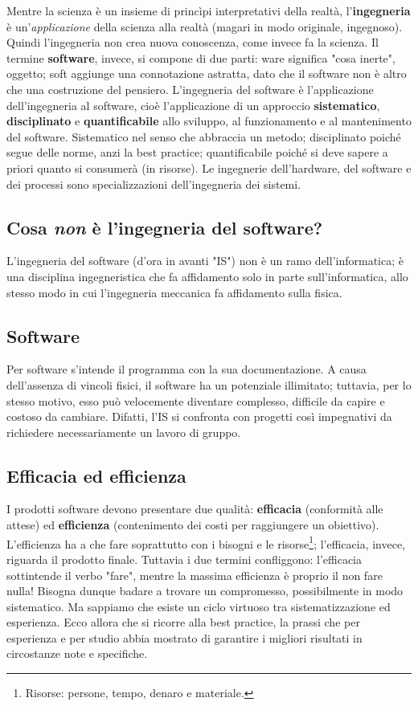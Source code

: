 \documentclass[a4paper]{article}
\begin{document}
		
Mentre la scienza è un insieme di princìpi interpretativi della realtà, l'\textbf{ingegneria} è un'\emph{applicazione} della scienza alla realtà (magari in modo originale, ingegnoso). Quindi l'ingegneria non crea nuova conoscenza, come invece fa la scienza. Il termine \textbf{software}, invece, si compone di due parti: ware significa "cosa inerte", oggetto; soft aggiunge una connotazione astratta, dato che il software non è altro che una costruzione del pensiero. L'ingegneria del software è l'applicazione dell'ingegneria al software, cioè l'applicazione di un approccio \textbf{sistematico}, \textbf{disciplinato} e \textbf{quantificabile} allo sviluppo, al funzionamento e al mantenimento del software. Sistematico nel senso che abbraccia un metodo; disciplinato poiché segue delle norme, anzi la best practice; quantificabile poiché si deve sapere a priori quanto si consumerà (in risorse). Le ingegnerie dell'hardware, del software e dei processi sono specializzazioni dell'ingegneria dei sistemi.

		
	\subsection{Cosa \emph{non} è l'ingegneria del software?}

		
L'ingegneria del software (d'ora in avanti "IS") non è un ramo dell'informatica; è una disciplina ingegneristica che fa affidamento solo in parte sull'informatica, allo stesso modo in cui l'ingegneria meccanica fa affidamento sulla fisica.

		
	\subsection{Software}

		
Per software s'intende il programma con la sua documentazione. A causa dell'assenza di vincoli fisici, il software ha un potenziale illimitato; tuttavia, per lo stesso motivo, esso può velocemente diventare complesso, difficile da capire e costoso da cambiare. Difatti, l'IS si confronta con progetti così impegnativi da richiedere necessariamente un lavoro di gruppo.

		
	\subsection{Efficacia ed efficienza}

		
I prodotti software devono presentare due qualità: \textbf{efficacia} (conformità alle attese) ed \textbf{efficienza} (contenimento dei costi per raggiungere un obiettivo). L'efficienza ha a che fare soprattutto con i bisogni e le risorse\footnote{Risorse: persone, tempo, denaro e materiale.}; l'efficacia, invece, riguarda il prodotto finale. Tuttavia i due termini confliggono: l'efficacia sottintende il verbo "fare", mentre la massima efficienza è proprio il non fare nulla! Bisogna dunque badare a trovare un compromesso, possibilmente in modo sistematico. Ma sappiamo che esiste un ciclo virtuoso tra sistematizzazione ed esperienza. Ecco allora che si ricorre alla best practice, la prassi che per esperienza e per studio abbia mostrato di garantire i migliori risultati in circostanze note e specifiche.
\end{document}
